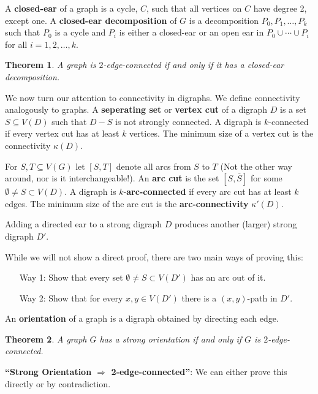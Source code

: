 \documentclass{Book}
\newtheorem{theorem}{Theorem}
\begin{document}
A \textbf{closed-ear} of a graph is a cycle, $C$, such that all vertices on $C$ have degree 2, except one. A \textbf{closed-ear decomposition} of $G$ is a decomposition $P_{0},P_{1}, \ldots, P_k$ such that $P_{0}$ is a cycle and $P_{i}$ is either a closed-ear or an open ear in $P_{0} \cup \cdots \cup P_{i}$ for all $i = 1, 2, \ldots, k$.

\begin{theorem}
	A graph is $2$-edge-connected if and only if it has a closed-ear decomposition.
\end{theorem}

We now turn our attention to connectivity in digraphs. We define connectivity analogously to graphs. A \textbf{seperating set} or \textbf{vertex cut} of a digraph $D$ is a set $S \subseteq V(D)$ such that $D-S$ is not strongly connected. A digraph is $k$-connected if every vertex cut has at least $k$ vertices. The minimum size of a vertex cut is the connectivity \(\kappa(D)\).

For $S, T \subseteq V(G)$ let $[S, T]$ denote all arcs from $S$ to $T$ (Not the other way around, nor is it interchangeable!). An \textbf{arc cut} is the set $[S, \overline{S}]$ for some $\emptyset \ne S \subset V(D)$. A digraph is $k$-\textbf{arc-connected} if every arc cut has at least $k$ edges. The minimum size of the arc cut is the \textbf{arc-connectivity} \(\kappa'(D)\).

\begin{proposition}
	Adding a directed ear to a strong digraph $D$ produces another (larger) strong digraph $D'$.
\end{proposition}

While we will not show a direct proof, there are two main ways of proving this:
\begin{enumerate}
	\item[Way 1: ] Show that every set $\emptyset \ne S \subset V(D')$ has an arc out of it.
	\item[Way 2: ] Show that for every $x,y \in V(D')$ there is a $(x,y)$-path in $D'$.
\end{enumerate}

An \textbf{orientation} of a graph is a digraph obtained by directing each edge.

\begin{theorem}
	A graph $G$ has a strong orientation if and only if $G$ is $2$-edge-connected.
\end{theorem}

\textbf{``Strong Orientation \(\Rightarrow\) 2-edge-connected''}: We can either prove this directly or by contradiction.
\end{document}
